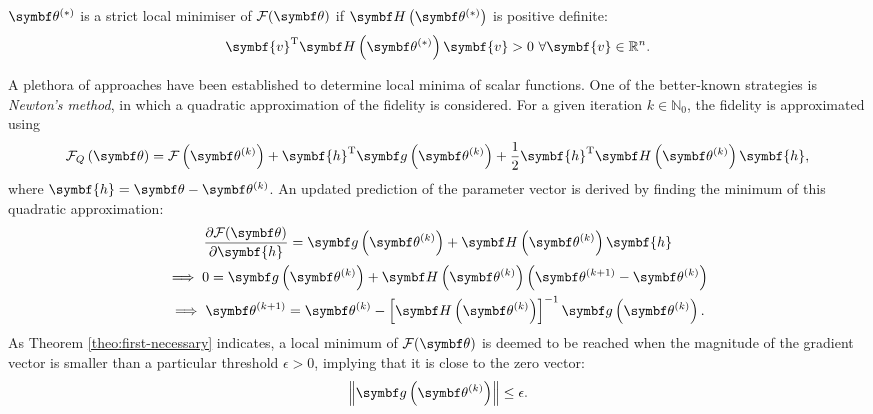 \begin{theorem}
  $\bthstar$ is a strict local minimiser of $\Fth$ if $\bdHthstar$ is positive
  definite:
  \begin{equation}
    \symbf{v}^{\mathrm{T}} \bdHthstar \symbf{v} > 0\ \forall \symbf{v} \in \mathbb{R}^n.
  \end{equation}
\end{theorem}
A plethora of approaches have been established to determine local minima of
scalar functions. One of the better-known strategies is \emph{Newton's method},
in which a quadratic approximation of the fidelity is considered.
For a given iteration $k \in \mathbb{N}_0$, the fidelity is approximated using
\begin{equation}
    \FQth =
        \Fthk +
        \symbf{h}\T \bdgthk +
        \frac{1}{2} \symbf{h}^{\mathrm{T}} \bdHthk \symbf{h},
    \label{eq:quad-approx}
\end{equation}
where $\symbf{h} = \bth - \bthk$.  An updated prediction of the parameter
vector is derived by finding the minimum of this quadratic approximation:
\begin{gather}
    \frac{\partial \Fth}{\partial \symbf{h}} =
        \bdgthk + \bdHthk \symbf{h} \notag\\
    \implies 0 = \bdgthk + \bdHthk \left(\bthkplusone - \bthk\right) \notag\\
    \implies \bthkplusone =
        \bthk - \left[\bdHthk\right]^{-1}
        \bdgthk.\label{eq:newton-update}
\end{gather}
As Theorem \ref{theo:first-necessary} indicates, a local minimum of $\Fth$ is
deemed to be reached when the magnitude of the gradient vector is smaller than
a particular threshold $\epsilon > 0$, implying that it is close to the zero
vector:
\begin{equation}
    \left\lVert \bdgthk \right\rVert \leq \epsilon.
\end{equation}

